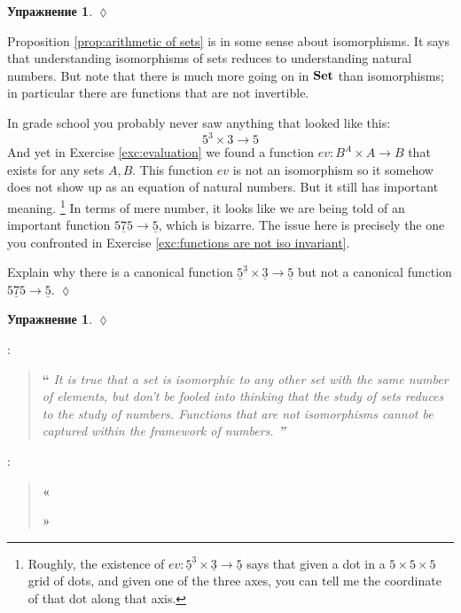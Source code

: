 \documentclass[a4paper]{book}
\def\to{\rightarrow}
\def\taking{\colon}
\def\too{\longrightarrow}
\def\ul{\underline}
\def\Set{{\bf Set}}
\theoremstyle{myth}
\newtheorem{excENG}[envENG]{\begin{english}Exercise\end{english}}
\newenvironment{exerciseENG}{\begin{excENG}}{\hspace*{\fill}$\lozenge$\end{excENG}}
\newenvironment{sloganENG}{\addtocounter{envENG}{1}\vspace{.1in}\begin{sloppypar}\noindent{\em Slogan}\;\arabic{envENG}: \begin{quote}{\bf “}\slshape}{{\bf ”}\end{quote}\end{sloppypar}\vspace{.1in}}
\newtheorem{excRUS}[envRUS]{Упражнение}
\newenvironment{exerciseRUS}{\begin{excRUS}}{\hspace*{\fill}$\lozenge$\end{excRUS}}
\newenvironment{sloganRUS}{\addtocounter{envRUS}{1}\vspace{.1in}\begin{sloppypar}\noindent{\em Лозунг}\;\arabic{envRUS}: \begin{quote}{\bf «}\slshape}{{\bf »}\end{quote}\end{sloppypar}\vspace{.1in}}
\begin{document}
\begin{russian}
\begin{exerciseRUS}
 
\end{exerciseRUS}

Proposition \ref{prop:arithmetic of sets} is in some sense about isomorphisms. It says that understanding isomorphisms of sets reduces to understanding natural numbers. But note that there is much more going on in $\Set$ than isomorphisms; in particular there are functions that are not invertible. 

 

In grade school you probably never saw anything that looked like this:
$$5^3\times 3\too 5$$
And yet in Exercise \ref{exc:evaluation} we found a function $ev\taking B^A\times A\to B$ that exists for any sets $A,B$. This function $ev$ is not an isomorphism so it somehow does not show up as an equation of natural numbers. But it still has important meaning.%
\footnote{Roughly, the existence of $ev\taking\ul{5}^{\ul{3}}\times\ul{3}\too \ul{5}$ says that given a dot in a $5\times 5\times 5$ grid of dots, and given one of the three axes, you can tell me the coordinate of that dot along that axis.} In terms of mere number, it looks like we are being told of an important function $\ul{575}\to\ul{5}$, which is bizarre. The issue here is precisely the one you confronted in Exercise \ref{exc:functions are not iso invariant}.

 

\begin{exerciseENG}
Explain why there is a canonical function $\ul{5}^{\ul{3}}\times\ul{3}\too \ul{5}$ but not a canonical function $\ul{575}\to\ul{5}$.
\end{exerciseENG}

\begin{exerciseRUS}
 
\end{exerciseRUS}

\begin{sloganENG}
It is true that a set is isomorphic to any other set with the same number of elements, but don't be fooled into thinking that the study of sets reduces to the study of numbers. Functions that are not isomorphisms cannot be captured within the framework of numbers. 
\end{sloganENG}

\begin{sloganRUS}
 
\end{sloganRUS}


\end{russian}
\end{document}
